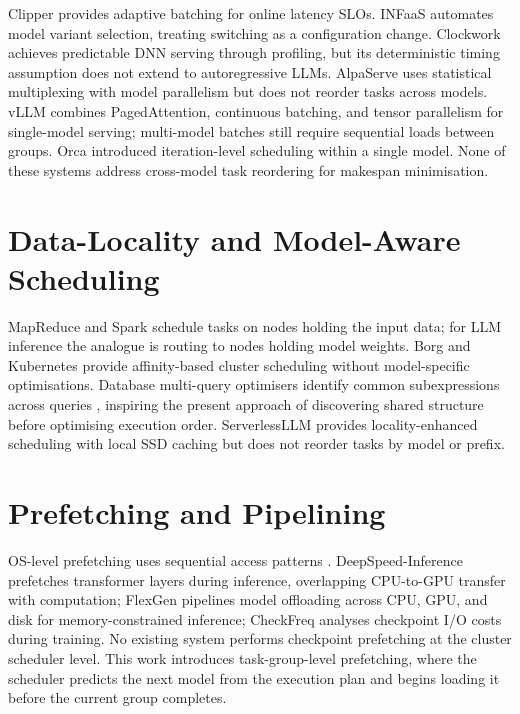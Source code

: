 \documentclass[logo,bsc,singlespacing,parskip,online]{infthesis}
\begin{document}
Clipper \citep{crankshaw2017clipper} provides adaptive batching for online latency SLOs. INFaaS \citep{romero2021infaas} automates model variant selection, treating switching as a configuration change. Clockwork \citep{gujarati2020serving} achieves predictable DNN serving through profiling, but its deterministic timing assumption does not extend to autoregressive LLMs. AlpaServe \citep{li2023alpaserve} uses statistical multiplexing with model parallelism but does not reorder tasks across models. vLLM \citep{kwon2023efficient} combines PagedAttention, continuous batching, and tensor parallelism for single-model serving; multi-model batches still require sequential loads between groups. Orca \citep{yu2022orca} introduced iteration-level scheduling within a single model. None of these systems address cross-model task reordering for makespan minimisation.

\section{Data-Locality and Model-Aware Scheduling}

MapReduce \citep{dean2008mapreduce} and Spark \citep{zaharia2010spark} schedule tasks on nodes holding the input data; for LLM inference the analogue is routing to nodes holding model weights. Borg \citep{verma2015large} and Kubernetes \citep{kubernetes2024} provide affinity-based cluster scheduling without model-specific optimisations. Database multi-query optimisers identify common subexpressions across queries \citep{sellis1988multiple}, inspiring the present approach of discovering shared structure before optimising execution order. ServerlessLLM \citep{fu2024serverlessllm} provides locality-enhanced scheduling with local SSD caching but does not reorder tasks by model or prefix.

\section{Prefetching and Pipelining}

OS-level prefetching uses sequential access patterns \citep{patterson2013computer}. DeepSpeed-Inference \citep{aminabadi2022deepspeed} prefetches transformer layers during inference, overlapping CPU-to-GPU transfer with computation; FlexGen \citep{sheng2023flexgen} pipelines model offloading across CPU, GPU, and disk for memory-constrained inference; CheckFreq \citep{mohan2021checkfreq} analyses checkpoint I/O costs during training. No existing system performs checkpoint prefetching at the cluster scheduler level. This work introduces task-group-level prefetching, where the scheduler predicts the next model from the execution plan and begins loading it before the current group completes.
\end{document}
